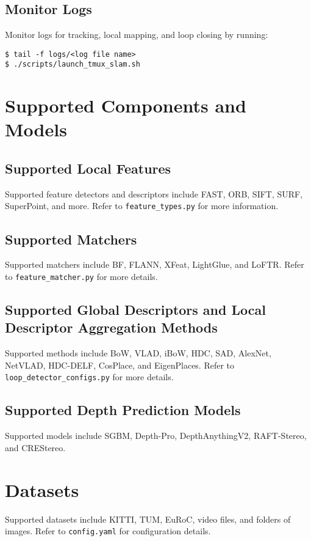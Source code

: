 \documentclass{article}
\begin{document}
\subsection{Monitor Logs}
Monitor logs for tracking, local mapping, and loop closing by running:
\begin{verbatim}
$ tail -f logs/<log file name>
$ ./scripts/launch_tmux_slam.sh
\end{verbatim}

\section{Supported Components and Models}

\subsection{Supported Local Features}
Supported feature detectors and descriptors include FAST, ORB, SIFT, SURF, SuperPoint, and more. Refer to \texttt{feature\_types.py} for more information.

\subsection{Supported Matchers}
Supported matchers include BF, FLANN, XFeat, LightGlue, and LoFTR. Refer to \texttt{feature\_matcher.py} for more details.

\subsection{Supported Global Descriptors and Local Descriptor Aggregation Methods}
Supported methods include BoW, VLAD, iBoW, HDC, SAD, AlexNet, NetVLAD, HDC-DELF, CosPlace, and EigenPlaces. Refer to \texttt{loop\_detector\_configs.py} for more details.

\subsection{Supported Depth Prediction Models}
Supported models include SGBM, Depth-Pro, DepthAnythingV2, RAFT-Stereo, and CREStereo.

\section{Datasets}
Supported datasets include KITTI, TUM, EuRoC, video files, and folders of images. Refer to \texttt{config.yaml} for configuration details.
\end{document}
